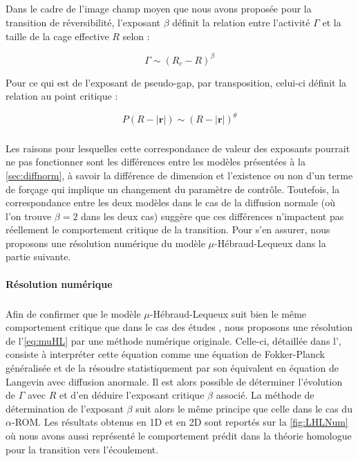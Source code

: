 \subparagraph{}Dans le cadre de l'image champ moyen que nous avons proposée pour la transition de réversibilité, l'exposant $\beta$ définit la relation entre l'activité $\Gamma$ et la taille de la cage effective $R$ selon :

\begin{equation}
	\Gamma \sim (R_c-R)^\beta
\end{equation}

\noindent Pour ce qui est de l'exposant de pseudo-gap, par transposition, celui-ci définit la relation au point critique :

\begin{equation}
	P(R-|\mathbf{r}|)\sim (R-|\mathbf{r}|)^\theta
\end{equation}

\subparagraph{}Les raisons pour lesquelles cette correspondance de valeur des exposants pourrait ne pas fonctionner sont les différences entre les modèles présentées à la \autoref{sec:diffnorm}, à savoir la différence de dimension et l'existence ou non d'un terme de forçage qui implique un changement du paramètre de contrôle. Toutefois, la correspondance entre les deux modèles dans le cas de la diffusion normale (où l'on trouve $\beta = 2$ dans les deux cas) suggère que ces différences n'impactent pas réellement le comportement critique de la transition. Pour s'en assurer, nous proposons une résolution numérique du modèle $\mu$-Hébraud-Lequeux dans la partie suivante.

\paragraph{Résolution numérique}

\subparagraph{}Afin de confirmer que le modèle $\mu$-Hébraud-Lequeux suit bien le même comportement critique que dans le cas des études \cite{lin_mean-field_2016, lin_microscopic_2018}, nous proposons une résolution de l'\autoref{eq:muHL} par une méthode numérique originale. Celle-ci, détaillée dans l', consiste à interpréter cette équation comme une équation de Fokker-Planck généralisée et de la résoudre statistiquement par son équivalent en équation de Langevin avec diffusion anormale. Il est alors possible de déterminer l'évolution de $\Gamma$ avec $R$ et d'en déduire l'exposant critique $\beta$ associé. La méthode de détermination de l'exposant $\beta$ suit alors le même principe que celle dans le cas du $\alpha$-ROM. Les résultats obtenus en 1D et en 2D sont reportés sur la \autoref{fig:LHLNum} où nous avons aussi représenté le comportement prédit dans la théorie homologue pour la transition vers l'écoulement.

